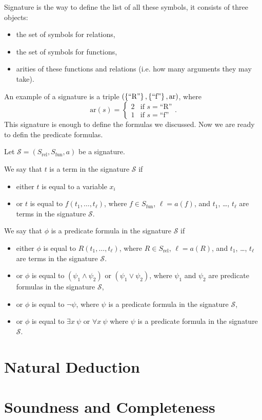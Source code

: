 Signature is the way to define the list of all these symbols, it consists of
three objects:
\begin{itemize}
  \item the set of symbols for relations,
  \item the set of symbols for functions,
  \item arities of these functions and relations (i.e. how many arguments they
    may take).
\end{itemize}
An example of a signature is a triple $(\set{\text{``R''}}, \set{\text{``f''}}, \mathrm{ar})$, where
\[
  \mathrm{ar}(s) = \begin{cases}
    2 & \text{if } s =  \text{``R''} \\
    1 & \text{if } s =  \text{``f''}
  \end{cases}.
\]
This signature is enough to define the formulas we discussed. Now we are ready
to defin the predicate formulas.

\begin{definition}
  Let $\mathcal{S} = (S_\mathrm{rel}, S_\mathrm{fun}, a)$ be a signature.

  We say that $t$ is a term in the signature $\mathcal{S}$ if
  \begin{itemize}
    \item either $t$ is equal to a variable $x_i$
    \item or $t$ is equal to $f(t_1, \dots, t_\ell)$, where
      $f \in S_\mathrm{fun}$, $\ell = a(f)$, and $t_1$, \dots, $t_\ell$
      are terms in the signature $\mathcal{S}$.
  \end{itemize}

  We say that $\phi$ is a predicate formula in the signature $\mathcal{S}$ if
  \begin{itemize}
    \item either $\phi$ is equal to $R(t_1, \dots, t_\ell)$, where
      $R \in S_\mathrm{rel}$, $\ell = a(R)$, and $t_1$, \dots, $t_\ell$
      are terms in the signature $\mathcal{S}$.
    \item or $\phi$ is equal to $(\psi_1 \land \psi_2)$ or
      $(\psi_1 \lor \psi_2)$, where $\psi_1$ and $\psi_2$ are predicate
      formulas in the signature $\mathcal{S}$,
    \item or $\phi$ is equal to $\lnot \psi$, where $\psi$ is a predicate
      formula in the signature $\mathcal{S}$,
    \item or $\phi$ is equal to $\exists x~\psi$ or $\forall x~\psi$ where
      $\psi$ is a predicate formula in the signature $\mathcal{S}$.
  \end{itemize}

\end{definition}



\section{Natural Deduction}
\section{Soundness and Completeness}
